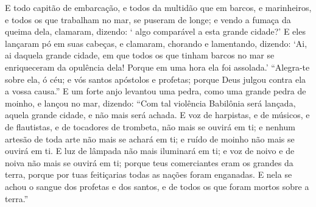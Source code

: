 {  E todo capitão de embarcação, e todos da multidão que
{} em barcos, e marinheiros, e todos os que trabalham no mar, se puseram de longe;
  e vendo a fumaça da queima dela, clamaram, dizendo: ‘{} algo comparável a esta grande cidade?’
  E eles lançaram pó em suas cabeças, e clamaram, chorando e lamentando, dizendo: ‘Ai, ai daquela grande cidade, em que todos os que tinham barcos no mar se enriqueceram da opulência dela! Porque em uma hora ela foi assolada.’
  “Alegra-te sobre ela, ó céu; e
{} vós santos apóstolos e profetas; porque Deus
{} julgou contra ela a vossa causa.”
  E um forte anjo levantou uma pedra, como uma grande pedra de moinho, e
{} lançou no mar, dizendo: “Com tal violência Babilônia será lançada, aquela grande cidade, e não mais será achada.
  E voz de harpistas, e de músicos, e de flautistas, e de tocadores de trombeta, não mais se ouvirá em ti; e nenhum artesão de toda arte não mais se achará em ti; e ruído de moinho não mais se ouvirá em ti.
  E luz de lâmpada não mais iluminará em ti; e voz de noivo e de noiva não mais se ouvirá em ti; porque teus comerciantes eram os grandes da terra, porque por tuas feitiçarias todas as nações foram enganadas.
  E nela se achou o sangue dos profetas e dos santos, e de todos os que foram mortos sobre a terra.”
\par }

